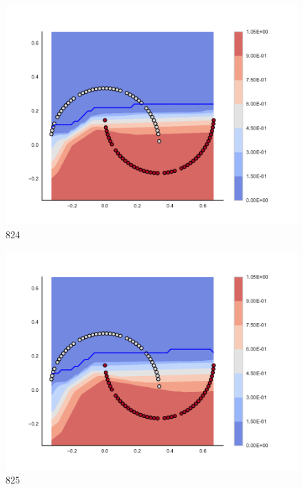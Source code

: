 \begin{subfigure}[b]{0.09\textwidth}
    \includegraphics[clip, trim=2.35cm 1.75cm 4.5cm 0cm,width=\textwidth]{img/convergence/824.pdf}
    \caption{824}
    \label{fig:convergence_824}
\end{subfigure}
%
\begin{subfigure}[b]{0.09\textwidth}
    \includegraphics[clip, trim=2.35cm 1.75cm 4.5cm 0cm,width=\textwidth]{img/convergence/825.pdf}
    \caption{825}
    \label{fig:convergence_825}
\end{subfigure}
%
